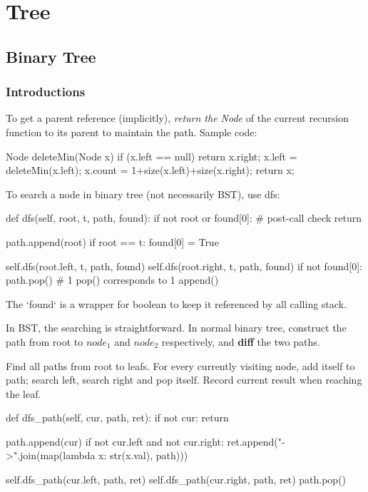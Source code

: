 \chapter{Tree}

\section{Binary Tree}
\subsection{Introductions}
 To get a parent reference (implicitly), \textit{return the Node} of the current recursion function to its parent to maintain the path. Sample code:
\begin{java}
Node deleteMin(Node x) {
    if (x.left == null) return x.right;
    x.left = deleteMin(x.left);
    x.count = 1+size(x.left)+size(x.right);
    return x;
}
\end{java}
 To search a node in binary tree (not necessarily BST), use dfs:
\begin{python}
def dfs(self, root, t, path, found):
    if not root or found[0]:  # post-call check
        return

    path.append(root)
    if root == t:
        found[0] = True

    self.dfs(root.left, t, path, found)
    self.dfs(root.right, t, path, found)
    if not found[0]:
        path.pop()  # 1 pop() corresponds to 1 append()
\end{python}
The `found` is a wrapper for boolean to keep it referenced by all calling stack. 

 In BST, the searching is straightforward. In normal binary tree, construct the path from root to $node_1$ and $node_2$ respectively, and \textbf{diff} the two paths.

 Find all paths from root to leafs. For every currently visiting node, add itself to path; search left, search right and pop itself. Record current result when reaching the leaf.
\begin{python}
def dfs_path(self, cur, path, ret):
    if not cur:
        return

    path.append(cur)
    if not cur.left and not cur.right:
        ret.append("->".join(map(lambda x: str(x.val), path)))

    self.dfs_path(cur.left, path, ret)
    self.dfs_path(cur.right, path, ret)
    path.pop()
\end{python}
 
